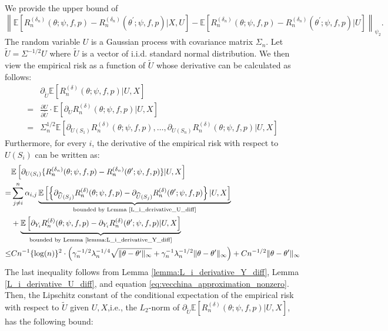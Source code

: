 \documentclass[12pt]{article}
\newcommand{\E}{\mathbb{E}}
\begin{document}
\noindent We provide the upper bound of 
$$\left\|\E\left[R_n^{(\delta_n)}(\theta;\psi,f,p)-R_n^{({\delta_n})}(\theta^\prime;\psi,f,p)|X,U\right]-\E\left[R_n^{(\delta_n)}(\theta;\psi,f,p)-R_n^{({\delta_n})}(\theta^\prime;\psi,f,p)|U\right]\right\|_{\psi_2}.$$
The random variable $U$ is a Gaussian process with covariance matrix $\Sigma_n$. Let $\widetilde U=\Sigma^{-1/2} U$ where $\widetilde U$ is a vector of i.i.d. standard normal distribution. We then view the empirical risk as a function of $\widetilde U$ whose derivative can be calculated as follows:
\begin{align*}
    &\partial_{ \widetilde U}\E\left[R_n^{(\delta)}(\theta;\psi,f,p)| U,X\right]\\
    = & \frac{\partial U}{ \partial \widetilde  U}\cdot  \E\left[\partial_{ U }R_n^{(\delta)}(\theta;\psi,f,p)| U,X\right]\\
    = & \Sigma_n^{1/2}\E\left[\partial_{U(S_1)}R_n^{(\delta)}(\theta;\psi,f,p),\ldots,\partial_{U(S_n)}R_n^{(\delta)}(\theta;\psi,f,p)| U,X\right]
\end{align*}
Furthermore, for every $i$, the derivative of the empirical risk with respect to $U(S_i)$ can be written as:
\begin{align*}
    &\E\left[\partial_{U(S_i)}\{R_n^{(\delta_n)}(\theta;\psi,f,p)-R_n^{({\delta_n})}(\theta^\prime;\psi,f,p)\}| U,X\right]\\
    = & \sum_{j\neq i}^n  \alpha_{i,j}\underbrace{\E\left[\left\{\partial_{\widehat U(S_j)}R_n^{(\delta)}(\theta;\psi,f,p)-\partial_{\widehat U(S_j)}R_n^{(\delta)}(\theta^\prime;\psi,f,p)\right\}| U,X\right]}_{\text{bounded by Lemma \ref{L_i_derivative_U_diff}}}\\
    &+ \underbrace{\E\left[\partial_{Y_i}R_n^{(\delta)}(\theta;\psi,f,p)   - \partial_{Y_i}R_n^{(\delta)}(\theta^\prime;\psi,f,p)| U,X\right]}_{\text{bounded by Lemma \ref{lemma:L_i_derivative_Y_diff}}}\\
    \leq &Cn^{-1}\{\log(n)\}^2\cdot\left( \gamma_n^{-1/2}\lambda_n^{-1/4}\sqrt{\|\theta-\theta'\|_\infty} + \gamma_n^{-1}\lambda_n^{-1/2}\|\theta-\theta'\|_\infty\right) + Cn^{-1/2}\|\theta-\theta'\|_\infty
\end{align*}
The last inequality follows from Lemma \ref{lemma:L_i_derivative_Y_diff}, Lemma \ref{L_i_derivative_U_diff}, and equation \eqref{eq:vecchina_approximation_nonzero}. Then, the Lipschitz constant of the conditional expectation of the empirical risk with respect to $\tilde U$ given $U,X$,i.e., the $L_2$-norm of $\partial_{ \widetilde U}\E\left[R_n^{(\delta)}(\theta;\psi,f,p)| U,X\right]$, has the following bound:
\end{document}
